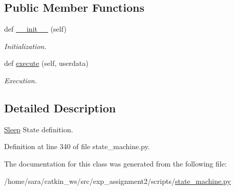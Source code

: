 \subsection*{Public Member Functions}
\begin{DoxyCompactItemize}
\item 
\mbox{\label{classstate__machine_1_1Sleep_a473b93a1ddf11f9e664d1fb694ce1a3c}} 
def \hyperlink{classstate__machine_1_1Sleep_a473b93a1ddf11f9e664d1fb694ce1a3c}{\+\_\+\+\_\+init\+\_\+\+\_\+} (self)
\begin{DoxyCompactList}\small\item\em Initialization. \end{DoxyCompactList}\item 
\mbox{\label{classstate__machine_1_1Sleep_a89527836f1edcefb6467fa9c041fbbfe}} 
def \hyperlink{classstate__machine_1_1Sleep_a89527836f1edcefb6467fa9c041fbbfe}{execute} (self, userdata)
\begin{DoxyCompactList}\small\item\em Execution. \end{DoxyCompactList}\end{DoxyCompactItemize}


\subsection{Detailed Description}
\hyperlink{classstate__machine_1_1Sleep}{Sleep} State definition. 

Definition at line 340 of file state\+\_\+machine.\+py.



The documentation for this class was generated from the following file\+:\begin{DoxyCompactItemize}
\item 
/home/sara/catkin\+\_\+ws/src/exp\+\_\+assignment2/scripts/\hyperlink{state__machine_8py}{state\+\_\+machine.\+py}\end{DoxyCompactItemize}
